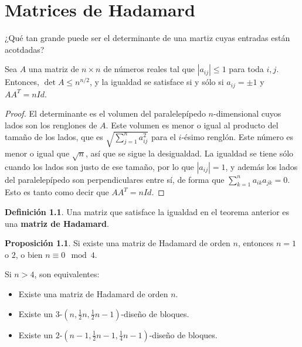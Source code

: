 \documentclass[spanish]{book}
\theoremstyle{definition}
\newtheorem*{defn}{Definición}
\newtheorem*{prop}{Proposición}
\begin{document}
\chapter{Matrices de Hadamard}
¿Qué tan grande puede ser el determinante de una martiz cuyas entradas están acotdadas?
\begin{teo}[de Hadamard]
	Sea $A$ una matriz de $n\times n$ de números reales tal que $|a_{ij}|\leq1$ para toda $i,j$. Entonces, $\det A\leq n^{n/2}$, y la igualdad se satisface si y sólo si $a_{ij}=\pm1$ y $AA^T=nId$.
\end{teo}
\begin{proof}
	El determinante es el volumen del paralelepípedo $n$-dimensional cuyos lados son los renglones de $A$. Este volumen es menor o igual al producto del tamaño de los lados, que es $\sqrt{\sum_{j=1}^n a_{ij}^2}$ para el $i$-ésimo renglón. Este número es menor o igual que $\sqrt{n}$, así que se sigue la desigualdad. La igualdad se tiene sólo cuando los lados son justo de ese tamaño, por lo que $|a_{ij}|=1$, y además los lados del paralelepípedo son perpendiculares entre sí, de forma que $\sum_{k=1}^na_{ik}a_{jk}=0$. Esto es tanto como decir que $AA^T=nId$.
\end{proof}
\begin{defn}
	Una matriz que satisface la igualdad en el teorema anterior es una \textbf{matriz de Hadamard}.
\end{defn}
\begin{prop}
	Si existe una matriz de Hadamard de orden $n$, entonces $n=1$ o $2$, o bien $n\equiv0\mod4$.
\end{prop}
\begin{teo}
	Si $n>4$, son equivalentes:
	\begin{itemize}
		\item Existe una matriz de Hadamard de orden $n$.
		\item Existe un $3$-$(n,\frac{1}{2}n,\frac{1}{2}n-1)$-diseño de bloques.
		\item Existe un $2$-$(n-1,\frac{1}{2}n-1,\frac{1}{4}n-1)$-diseño de bloques.
	\end{itemize}
\end{teo}
\end{document}
